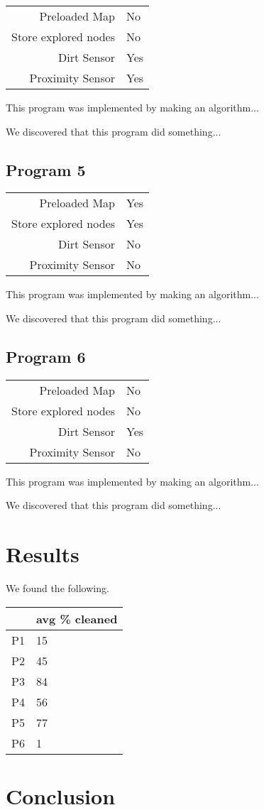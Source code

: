 \documentclass[letterpaper]{article}
\begin{document}
\begin{tabular}{ r | l }  
	Preloaded Map			& No \\
	Store explored nodes	& No \\
	Dirt Sensor				& Yes \\
	Proximity Sensor		& Yes \\
\end{tabular}

This program was implemented by making an algorithm...

We discovered that this program did something...


\subsection{Program 5}

\begin{tabular}{ r | l }  
	Preloaded Map			& Yes \\
	Store explored nodes	& Yes \\
	Dirt Sensor				& No \\
	Proximity Sensor		& No \\
\end{tabular}

This program was implemented by making an algorithm...

We discovered that this program did something...


\subsection{Program 6}

\begin{tabular}{ r | l }  
	Preloaded Map			& No \\
	Store explored nodes	& No \\
	Dirt Sensor				& Yes \\
	Proximity Sensor		& No \\
\end{tabular}

This program was implemented by making an algorithm...

We discovered that this program did something...


\section{Results}

We found the following.

\begin{tabular}{ r | l }  
	\toprule
		& avg \% cleaned \\
	\midrule
	P1	& 15 \\
	P2	& 45 \\
	P3	& 84 \\
	P4	& 56 \\
	P5	& 77 \\
	P6	& 1 \\
	\bottomrule
\end{tabular}

\section{Conclusion}


\nocite{*}


\end{document}
